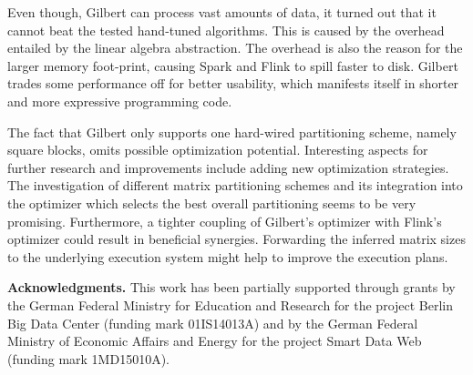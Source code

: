 Even though, Gilbert can process vast amounts of data, it turned out that it cannot beat the tested hand-tuned algorithms.
This is caused by the overhead entailed by the linear algebra abstraction. 
The overhead is also the reason for the larger memory foot-print, causing Spark and Flink to spill faster to disk.
Gilbert trades some performance off for better usability, which manifests itself in shorter and more expressive programming code. 

The fact that Gilbert only supports one hard-wired partitioning scheme, namely square blocks, omits possible optimization potential. 
Interesting aspects for further research and improvements include adding new optimization strategies. 
The investigation of different matrix partitioning schemes and its integration into the optimizer which selects the best overall partitioning seems to be very promising. 
Furthermore, a tighter coupling of Gilbert's optimizer with Flink's optimizer could result in beneficial synergies. 
Forwarding the inferred matrix sizes to the underlying execution system might help to improve the execution plans.

\textbf{Acknowledgments.}
This work has been partially supported through grants by the German Federal Ministry for Education and Research for the project Berlin Big Data Center (funding mark 01IS14013A) and by the German Federal Ministry of Economic Affairs and Energy for the project Smart Data Web (funding mark 1MD15010A).